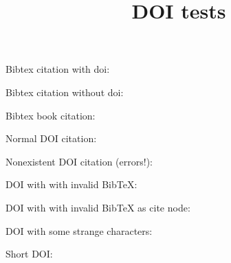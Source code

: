 \documentclass{article}
\title{DOI tests}
\date{\displaydate{articleDate}}
\author{}
\begin{document}
\maketitle
\keywords{}

Bibtex citation with doi: \cite{Vogel2018systemic}

Bibtex citation without doi: \cite{Meurer2020framework}

Bibtex book citation: \cite{RN1}

Normal DOI citation: \cite{Koch_2012}

Nonexistent DOI citation (errors!): \href{https://doi.org/10.1111/j.1365-246X.2012.99999.x}{}

DOI with with invalid BibTeX: \cite{EFSA2019Dietary}

DOI with with invalid BibTeX as cite node: \cite{EFSA2019Dietary}

DOI with some strange characters: \cite{Bartels_1997}

Short DOI: \cite{PRIESTLEY_1972}

\clearpage

\end{document}

